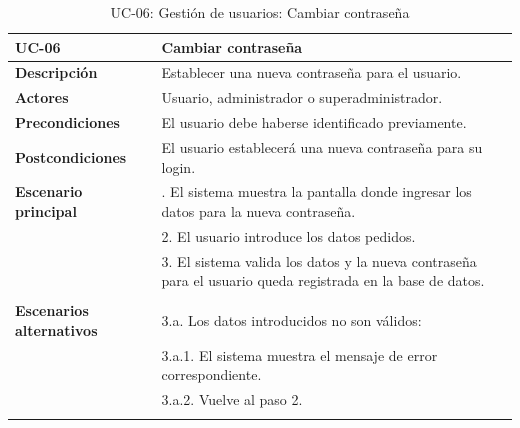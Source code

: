 \begin{table}
  \begin{center}
    \begin{tabularx}{16.4cm}{|l|X|}
      \hline
      \textbf{UC-06} & \textbf{Cambiar contraseña}\\
      \hline
      \textbf{Descripción} & Establecer una nueva contraseña para el usuario.\\
      \hline
      \textbf{Actores} & Usuario, administrador o superadministrador.\\
      \hline
      \textbf{Precondiciones} & El usuario debe haberse identificado previamente.\\
      \hline
      \textbf{Postcondiciones} & El usuario establecerá una nueva contraseña para su login.\\
      \hline
      \textbf{Escenario principal} & \smallskip 1. El sistema muestra la pantalla donde ingresar los datos para la nueva contraseña.\\
      & 2. El usuario introduce los datos pedidos.\\
      & 3. El sistema valida los datos y la nueva contraseña para el usuario queda registrada en la base de datos.\\
      & \\
      \hline
      \textbf{Escenarios alternativos} & \smallskip 3.a. Los datos introducidos no son válidos:\\
      & \hspace{0.3cm} 3.a.1. El sistema muestra el mensaje de error correspondiente.\\
      & \hspace{0.3cm} 3.a.2. Vuelve al paso 2.\\
      & \\
      \hline
    \end{tabularx}
    \caption{UC-06: Gestión de usuarios: Cambiar contraseña}
    \label{tab:CU-cambiar-contrasena}
  \end{center}
\end{table}


